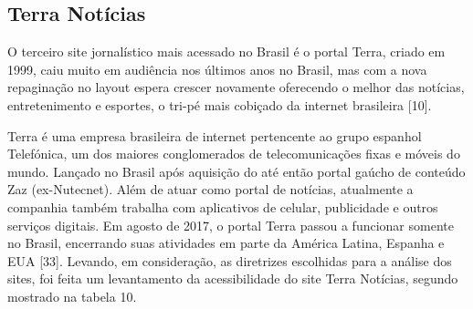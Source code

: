 \documentclass[a4paper]{article}
\begin{document}
\begin{titlepage}
\subsection{Terra Notícias}

O terceiro site jornalístico mais acessado no Brasil é o portal Terra, criado em 1999, caiu muito em audiência nos últimos anos no Brasil, mas com a nova repaginação no layout espera crescer novamente oferecendo o melhor das notícias, entretenimento e esportes, o tri-pé mais cobiçado da internet brasileira [10].

Terra é uma empresa brasileira de internet pertencente ao grupo espanhol Telefónica, um dos maiores conglomerados de telecomunicações fixas e móveis do mundo. Lançado no Brasil após aquisição do até então portal gaúcho de conteúdo Zaz (ex-Nutecnet). Além de atuar como portal de notícias, atualmente a companhia também trabalha com aplicativos de celular, publicidade e outros serviços digitais. Em agosto de 2017, o portal Terra passou a funcionar somente no Brasil, encerrando suas atividades em parte da América Latina, Espanha e EUA [33]. Levando, em consideração, as diretrizes escolhidas para a análise dos sites, foi feita um levantamento da acessibilidade do site Terra Notícias, segundo mostrado na tabela 10.\\


\end{titlepage}
\end{document}
